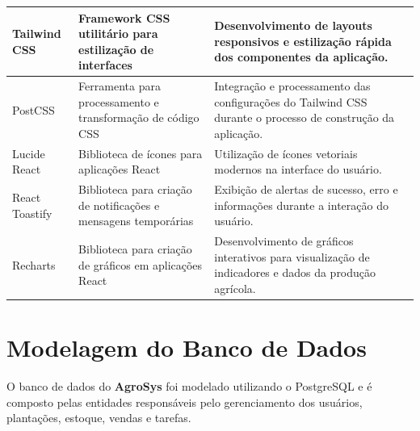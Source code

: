 \documentclass[12pt]{article}
\begin{document}
\begin{longtable}{|p{3cm}|p{4.2cm}|p{7cm}|}
  Tailwind CSS                                                                           &
  Framework CSS utilitário para estilização de interfaces                                &
  Desenvolvimento de layouts responsivos e estilização rápida dos componentes da aplicação.                                                    \\
  \hline

  PostCSS                                                                                &
  Ferramenta para processamento e transformação de código CSS                            &
  Integração e processamento das configurações do Tailwind CSS durante o processo de construção da aplicação.                                  \\
  \hline

  Lucide React                                                                           &
  Biblioteca de ícones para aplicações React                                             &
  Utilização de ícones vetoriais modernos na interface do usuário.                                                                             \\
  \hline

  React Toastify                                                                         &
  Biblioteca para criação de notificações e mensagens temporárias                        &
  Exibição de alertas de sucesso, erro e informações durante a interação do usuário.                                                           \\
  \hline

  Recharts                                                                               &
  Biblioteca para criação de gráficos em aplicações React                                &
  Desenvolvimento de gráficos interativos para visualização de indicadores e dados da produção agrícola.                                       \\
  \hline
\end{longtable}


\section{Modelagem do Banco de Dados}

O banco de dados do \textbf{AgroSys} foi modelado utilizando o PostgreSQL e é composto pelas entidades responsáveis pelo gerenciamento dos usuários, plantações, estoque, vendas e tarefas.
\end{document}
